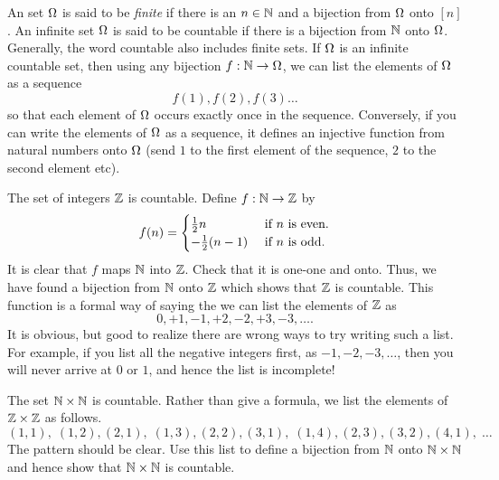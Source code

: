 \documentclass[preprint,  11pt]{amsart}
\def\half{\frac{1}{2}}
\begin{document}


\bdefn An set $\Omega$ is said to be {\em finite} if there is an $n\in \mathbb{N}$ and a bijection from $\Omega$ onto $[n]$. An infinite set $\Omega$ is said to be countable if there is a bijection from $\mathbb{N}$ onto $\Omega$. 
\edefn
Generally, the word countable also includes finite sets. If $\Omega$ is an infinite countable set, then using any bijection $f:\mathbb{N}\rightarrow \Omega$, we can list the elements of $\Omega$ as a sequence $$f(1),f(2),f(3)\ldots$$ so that each element of $\Omega$ occurs exactly once in the sequence. Conversely, if you can write the elements of $\Omega$ as a sequence, it defines an injective function from natural numbers onto $\Omega$ (send $1$ to the first element of the sequence, $2$ to the second element etc).

\beg The set of integers $\mathbb{Z}$ is countable. Define $f:\mathbb{N}\rightarrow \mathbb{Z}$ by 
$$
f(n)=\begin{cases}\half n & \mb{ if }n\mb{ is even}. \\
-\half (n-1) & \mb{ if }n\mb{ is odd}.
\end{cases}
$$ 
It is clear that $f$ maps $\mathbb{N}$ into $\mathbb{Z}$. Check that it is one-one and onto. Thus, we have found a bijection from $\mathbb{N}$ onto $\mathbb{Z}$ which shows that $\mathbb{Z}$ is countable. This function is a formal way of saying the we can list the elements of $\mathbb{Z}$ as
$$
0, +1, -1,+2,-2,+3,-3,\ldots.
$$
It is obvious, but good to realize there are wrong ways to try writing such a list. For example, if you list all the negative integers first, as $-1,-2,-3,\ldots$, then you will never arrive at $0$ or $1$, and hence the list is incomplete!
\eeg

\beg The set $\mathbb{N}\times \mathbb{N}$ is countable. Rather than give a formula, we list the elements of $\mathbb{Z}\times \mathbb{Z}$ as follows.
$$
(1,1), \; (1,2), (2,1), \; (1,3), (2,2), (3,1), \; (1,4),(2,3),(3,2),(4,1),  \; \ldots 
$$
The pattern should be clear. Use this list to define a bijection from $\mathbb{N}$ onto $\mathbb{N}\times \mathbb{N}$ and hence show that $\mathbb{N}\times \mathbb{N}$ is countable.
\eeg
\end{document}
